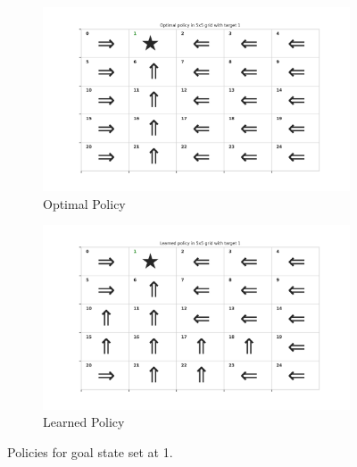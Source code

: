 \begin{figure}[!htbp]
    \centering
    \begin{subfigure}[b]{0.49\linewidth}
        \centering
        \includegraphics[width=\linewidth]{experimentation/images/Optimal policy in 5x5 grid with target 1.png}
        \caption{Optimal Policy}
    \end{subfigure}
    \begin{subfigure}[b]{0.49\linewidth}
        \centering
        \includegraphics[width=\linewidth]{experimentation/images/Learned policy in 5x5 grid with target 1.png}
        \caption{Learned Policy}
    \end{subfigure}
    \caption{Policies for goal state set at 1.}
    \label{fig:policy_1}
\end{figure}

